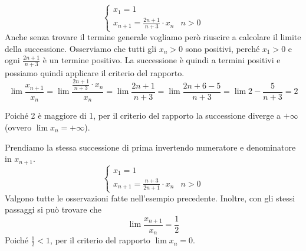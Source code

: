 \begin{example}
\begin{equation*}
\begin{cases}
x_1 = 1\\
x_{n+1} = \frac{2n+1}{n+3} \cdot x_n& \mbox{}n > 0
\end{cases}
\end{equation*}
Anche senza trovare il termine generale vogliamo però riuscire a calcolare il limite della successione. Osserviamo che tutti gli $x_n > 0$ sono positivi, perché $x_1 > 0$ e ogni $\frac{2n+1}{n+3}$ è un termine positivo. La successione è quindi a termini positivi e possiamo quindi applicare il criterio del rapporto.
\begin{equation*}
\lim \frac{x_{n+1}}{x_n} = \lim \frac{\frac{2n+1}{n+3} \cdot x_n}{x_n} = \lim \frac{2n + 1}{n + 3} = \lim \frac{2n + 6 - 5}{n + 3} = \lim 2 - \frac{5}{n + 3} = 2
\end{equation*}

Poiché 2 è maggiore di 1, per il criterio del rapporto la successione diverge a $+\infty$ (ovvero $\lim x_n = +\infty$).
\end{example}

\begin{example}
Prendiamo la stessa successione di prima invertendo numeratore e denominatore in $x_{n+1}$.
\begin{equation*}
\begin{cases}
x_1 = 1\\
x_{n+1} = \frac{n+3}{2n+1} \cdot x_n& \mbox{}n > 0
\end{cases}
\end{equation*}
Valgono tutte le osservazioni fatte nell'esempio precedente. Inoltre, con gli stessi passaggi si può trovare che 
\begin{equation*}
\lim \frac{x_{n+1}}{x_n} = \frac{1}{2}
\end{equation*}
Poiché $\frac{1}{2} < 1$, per il criterio del rapporto $\lim x_n = 0$.
\end{example}

